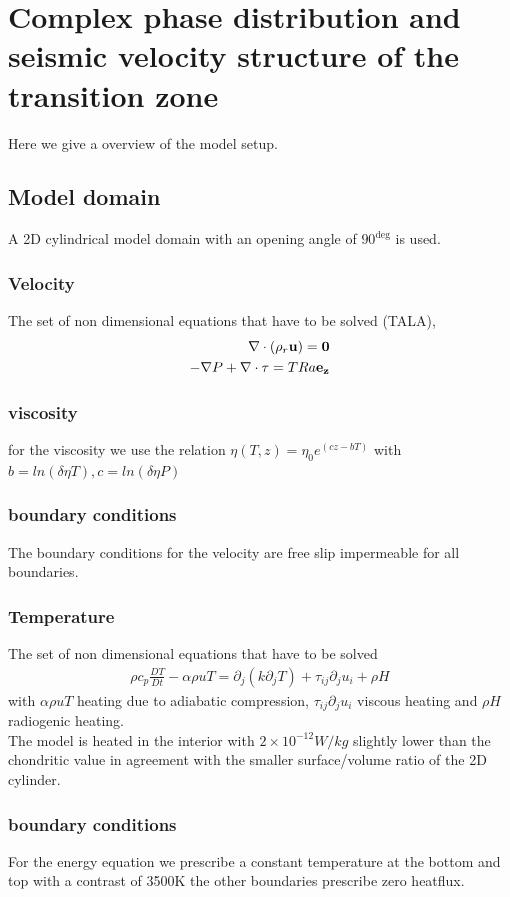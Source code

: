 \documentclass[11pt]{article}
\begin{document}
\section{Complex phase distribution and seismic velocity structure of the
transition zone}

Here we give a overview of the model setup.


\subsection{Model domain}
A 2D cylindrical model domain with an opening angle of $90^{\deg}$ is used. 
\subsubsection{Velocity}
The set of non dimensional equations that have to be solved (TALA),
\begin{eqnarray}
 \nabla \cdot (\rho_{r}\bf u) = 0 \\
-\nabla P + \nabla \cdot \tau = T Ra \bf e_{z}
\end{eqnarray} 
\subsubsection{viscosity}
for the viscosity we use the relation 
$\eta(T, z) = \eta_{0} e^{(cz -b T )}$ with 
$b = ln(\delta \eta T ), c = ln(\delta \eta P )$
\subsubsection{boundary conditions}
The boundary conditions for the velocity are free slip impermeable for all boundaries.
\subsubsection{Temperature}
The set of non dimensional equations that have to be solved
\begin{eqnarray}
\rho c_{p} \frac{DT}{Dt} - \alpha \rho u T = \partial_{j} (k\partial_{j} T) + \tau_{ij}\partial_{j}u_{i}  + \rho H
\end{eqnarray}
with $\alpha \rho u T $ heating due to adiabatic compression, $\tau_{ij}\partial_{j}u_{i}$ viscous heating and $\rho H$ radiogenic heating. \\
The model is heated in the interior with $2\times 10^{-12} W/kg$ slightly lower than the chondritic value in agreement with the smaller surface/volume ratio of the 2D cylinder.
\subsubsection{boundary conditions}
For the energy equation we prescribe a constant temperature at the bottom and top with a contrast of 3500K
the other boundaries prescribe zero heatflux.
\end{document}
